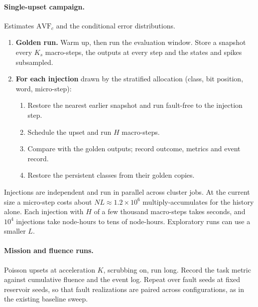 \documentclass[11pt,a4paper]{article}
\newcommand{\AVF}{\mathrm{AVF}}
\begin{document}
\paragraph{Single-upset campaign.} Estimates $\AVF_c$ and the conditional error distributions.
\begin{enumerate}
  \item \textbf{Golden run.} Warm up, then run the evaluation window. Store a snapshot every $K_s$ macro-steps, the outputs at every step and the states and spikes subsampled.
  \item \textbf{For each injection} drawn by the stratified allocation (class, bit position, word, micro-step):
  \begin{enumerate}
    \item Restore the nearest earlier snapshot and run fault-free to the injection step.
    \item Schedule the upset and run $H$ macro-steps.
    \item Compare with the golden outputs; record outcome, metrics and event record.
    \item Restore the persistent classes from their golden copies.
  \end{enumerate}
\end{enumerate}
Injections are independent and run in parallel across cluster jobs. At the current size a micro-step costs about $NL \approx 1.2\times10^6$ multiply-accumulates for the history alone. Each injection with $H$ of a few thousand macro-steps takes seconds, and $10^4$ injections take node-hours to tens of node-hours. Exploratory runs can use a smaller $L$.

\paragraph{Mission and fluence runs.} Poisson upsets at acceleration $K$, scrubbing on, run long. Record the task metric against cumulative fluence and the event log. Repeat over fault seeds at fixed reservoir seeds, so that fault realizations are paired across configurations, as in the existing baseline sweep.
\end{document}
